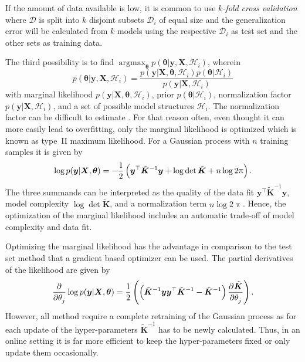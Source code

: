 \documentclass[11pt,a4paper,twoside,BCOR=15mm]{scrreprt}
\newcommand{\vc}[1]{\bm{#1}}
\newcommand{\mat}[1]{\bm{#1}}
\newcommand{\Tr}{^{\top}}
\DeclareMathOperator*{\argmax}{argmax}
\newcommand{\newterm}[1]{\emph{#1}}
\begin{document}
If the amount of data available is low, it is common to use \newterm{$k$-fold 
    cross validation} where $\mathcal{D}$ is split into $k$ disjoint subsets 
$\mathcal{D}_i$ of equal size and the generalization error will be calculated 
from $k$ models using the respective $\mathcal{D}_i$ as test set and the other 
sets as training data.

The third possibility is to find $\argmax_{\vc \theta} p(\vc\theta | \vc y, \mat 
X, \mathcal{H}_i)$, wherein
\begin{equation}
    p(\vc\theta | \vc y, \mat X, \mathcal{H}_i) = \frac{p(\vc y | \mat X, 
        \vc\theta, \mathcal{H}_i) p(\vc\theta | \mathcal{H}_i)}{p(\vc y | \mat 
        X, \mathcal{H}_i)}
\end{equation}
with marginal likelihood $p(\vc y | \mat X, \vc\theta, \mathcal{H}_i)$, prior 
$p(\vc\theta | \mathcal{H}_i)$, normalization factor $p(\vc y | \mat X, 
\mathcal{H}_i)$, and a set of possible model structures $\mathcal{H}_i$. The 
normalization factor can be difficult to estimate 
\parencite[109]{Rasmussen:2006vz}. For that reason often, even thought it can 
more easily lead to overfitting, only the marginal likelihood is optimized which 
is known as type~II maximum likelihood. For a Gaussian process with $n$ training 
samples it is given by
\begin{equation}
    \log p(\vc y | \mat X, \vc\theta) = -\frac{1}{2}\del{\vc y\Tr 
        \tilde{\mat{K}}^{-1} \vc y + \log \det \tilde{\mat K} + n \log 2\uppi} 
    \text{.}
\end{equation}
The three summands can be interpreted as the quality of the data fit $\vc y\Tr 
\tilde{\mat K}^{-1} \vc y$, model complexity $\log \det \tilde{\mat K}$, and 
a normalization term $n \log 2\uppi$. Hence, the optimization of the marginal 
likelihood includes an automatic trade-off of model complexity and data fit.

Optimizing the marginal likelihood has the advantage in comparison to the test 
set method that a gradient based optimizer can be used. The partial derivatives 
of the likelihood are given by
\begin{equation}
    \dpd{}{\theta_j} \log p(\vc y | \mat X, \vc\theta) = \frac{1}{2} 
    \del{\del{\tilde{\mat K}^{-1}\vc y \vc y\Tr \tilde{\mat K}^{-1} 
            - \tilde{\mat{K}}^{-1}} \dpd{\tilde{\mat K}}{\theta_j}} \text{.}
\end{equation}
However, all method require a complete retraining of the Gaussian process as for 
each update of the hyper-parameters $\tilde{\mat K}^{-1}$ has to be newly 
calculated. Thus, in an online setting it is far more efficient to keep the 
hyper-parameters fixed or only update them occasionally.
\end{document}
